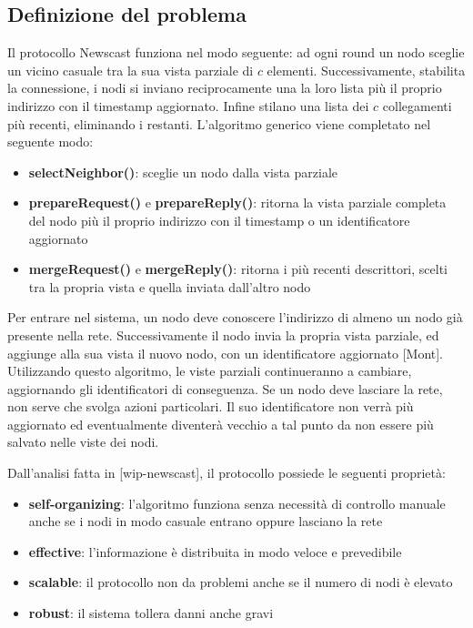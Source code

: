 \subsection{Definizione del problema}
Il protocollo Newscast funziona nel modo seguente: ad ogni round un nodo sceglie un vicino casuale tra la sua vista parziale di $c$ elementi. Successivamente, stabilita la connessione, i nodi si inviano reciprocamente una la loro lista più il proprio indirizzo con il timestamp aggiornato. Infine stilano una lista dei $c$ collegamenti più recenti, eliminando i restanti.
L’algoritmo generico viene completato nel seguente modo:
\begin{itemize}
    \item \textbf{selectNeighbor()}: sceglie un nodo dalla vista parziale
    \item \textbf{prepareRequest()} e \textbf{prepareReply()}: ritorna la vista parziale completa del nodo più il proprio indirizzo con il timestamp o un identificatore aggiornato
    \item \textbf{mergeRequest()} e \textbf{mergeReply()}: ritorna i più recenti descrittori, scelti tra la propria vista e quella inviata dall’altro nodo
\end{itemize}
Per entrare nel sistema, un nodo deve conoscere l'indirizzo di almeno un nodo già presente nella rete. Successivamente il nodo invia la propria vista parziale, ed aggiunge alla sua vista il nuovo nodo, con un identificatore aggiornato [Mont]. Utilizzando questo algoritmo, le viste parziali continueranno a cambiare, aggiornando gli identificatori di conseguenza. Se un nodo deve lasciare la rete, non serve che svolga azioni particolari. Il suo identificatore non verrà più aggiornato ed eventualmente diventerà vecchio a tal punto da non essere più salvato nelle viste dei nodi.

Dall'analisi fatta in [wip-newscast], il protocollo possiede le seguenti proprietà:
\begin{itemize}
    \item \textbf{self-organizing}: l'algoritmo funziona senza necessità di controllo manuale anche se i nodi in modo casuale entrano oppure lasciano la rete
    \item \textbf{effective}: l'informazione è distribuita in modo veloce e prevedibile
    \item \textbf{scalable}: il protocollo non da problemi anche se il numero di nodi è elevato
    \item \textbf{robust}: il sistema tollera danni anche gravi
\end{itemize} 

